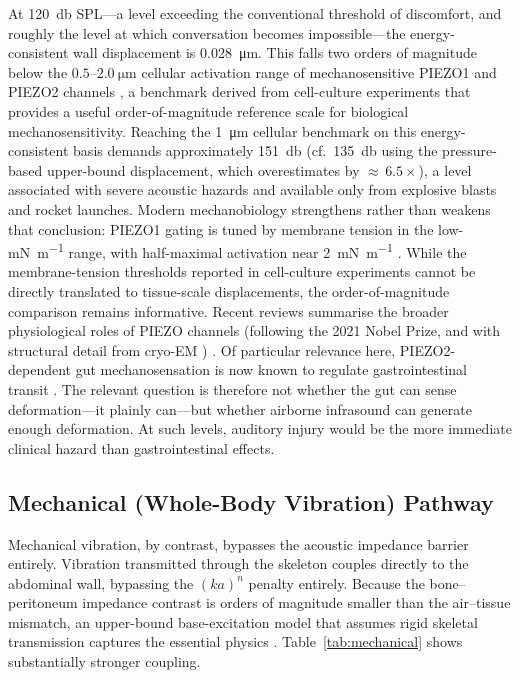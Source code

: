 At \SI{120}{\decibel} SPL---a level exceeding the conventional threshold of
discomfort, and roughly the level at
which conversation becomes impossible---the energy-consistent wall
displacement is \SI{0.028}{\micro\metre}.  This falls two orders of magnitude
below the $0.5$--$\SI{2.0}{\micro\metre}$ cellular activation range of
mechanosensitive PIEZO1 and PIEZO2 channels \cite{coste2010piezo1}, a
benchmark derived from cell-culture experiments that provides a useful
order-of-magnitude reference scale for biological mechanosensitivity.
Reaching the
\SI{1}{\micro\metre} cellular benchmark on this energy-consistent basis demands
approximately \SI{151}{\decibel} (cf.\ \SI{135}{\decibel} using the
pressure-based upper-bound displacement, which overestimates by
${\approx}\,6.5\times$), a level associated with severe
acoustic hazards and available only from explosive blasts and rocket launches.
Modern mechanobiology strengthens rather than weakens that conclusion:
PIEZO1 gating is tuned by membrane tension in the low-\si{\milli\newton\per\metre}
range, with half-maximal activation near \SI{2}{\milli\newton\per\metre}
\cite{Lewis2015}.  While the membrane-tension thresholds reported in
cell-culture experiments cannot be directly translated to tissue-scale
displacements, the order-of-magnitude comparison remains informative.  Recent
reviews summarise the broader physiological roles of PIEZO channels
(following the 2021 Nobel Prize, and with structural detail from cryo-EM
\cite{Saotome2018}) \cite{Xiao2024}.  Of particular relevance here,
PIEZO2-dependent
gut mechanosensation is now known to regulate gastrointestinal transit
\cite{ServinVences2023}.  The relevant question is therefore not whether the
gut can sense deformation---it plainly can---but whether airborne infrasound
can generate enough deformation.  At such levels, auditory injury would be the
more immediate clinical hazard than gastrointestinal effects.

\subsection{Mechanical (Whole-Body Vibration) Pathway}

Mechanical vibration, by contrast, bypasses the acoustic
impedance barrier entirely.  Vibration transmitted through the
skeleton couples directly to the abdominal wall, bypassing the $(ka)^n$
penalty entirely.  Because the bone--peritoneum impedance contrast is orders
of magnitude smaller than the air--tissue mismatch, an upper-bound
base-excitation model that assumes rigid skeletal transmission
captures the essential physics \cite{FahyGardonio2007,Gupta2021}.
Table~\ref{tab:mechanical} shows substantially stronger coupling.

